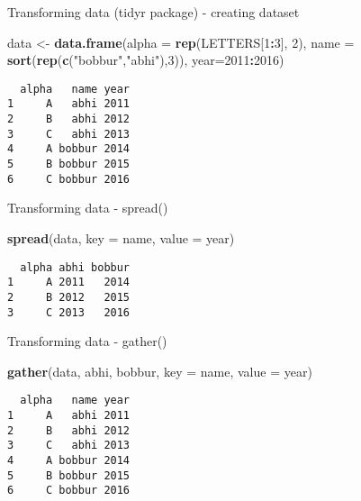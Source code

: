 \documentclass[ignorenonframetext,]{beamer}
\newenvironment{Shaded}{\begin{snugshade}}{\end{snugshade}}
\newcommand{\DataTypeTok}[1]{\textcolor[rgb]{0.13,0.29,0.53}{#1}}
\newcommand{\DecValTok}[1]{\textcolor[rgb]{0.00,0.00,0.81}{#1}}
\newcommand{\KeywordTok}[1]{\textcolor[rgb]{0.13,0.29,0.53}{\textbf{#1}}}
\newcommand{\NormalTok}[1]{#1}
\newcommand{\OperatorTok}[1]{\textcolor[rgb]{0.81,0.36,0.00}{\textbf{#1}}}
\newcommand{\StringTok}[1]{\textcolor[rgb]{0.31,0.60,0.02}{#1}}
\begin{document}
\begin{frame}[fragile]{Transforming data (tidyr package) - creating
dataset}
\protect\hypertarget{transforming-data-tidyr-package---creating-dataset}{}

\begin{Shaded}
\begin{Highlighting}[]
\NormalTok{data <-}\StringTok{ }\KeywordTok{data.frame}\NormalTok{(}\DataTypeTok{alpha =} \KeywordTok{rep}\NormalTok{(LETTERS[}\DecValTok{1}\OperatorTok{:}\DecValTok{3}\NormalTok{], }\DecValTok{2}\NormalTok{), }
\DataTypeTok{name =} \KeywordTok{sort}\NormalTok{(}\KeywordTok{rep}\NormalTok{(}\KeywordTok{c}\NormalTok{(}\StringTok{"bobbur"}\NormalTok{,}\StringTok{"abhi"}\NormalTok{),}\DecValTok{3}\NormalTok{)), }\DataTypeTok{year=}\DecValTok{2011}\OperatorTok{:}\DecValTok{2016}\NormalTok{)}
\end{Highlighting}
\end{Shaded}

\begin{verbatim}
  alpha   name year
1     A   abhi 2011
2     B   abhi 2012
3     C   abhi 2013
4     A bobbur 2014
5     B bobbur 2015
6     C bobbur 2016
\end{verbatim}

\end{frame}

\begin{frame}[fragile]{Transforming data - spread()}
\protect\hypertarget{transforming-data---spread}{}

\begin{Shaded}
\begin{Highlighting}[]
\KeywordTok{spread}\NormalTok{(data, }\DataTypeTok{key =}\NormalTok{ name, }\DataTypeTok{value =}\NormalTok{ year) }
\end{Highlighting}
\end{Shaded}

\begin{verbatim}
  alpha abhi bobbur
1     A 2011   2014
2     B 2012   2015
3     C 2013   2016
\end{verbatim}

\end{frame}

\begin{frame}[fragile]{Transforming data - gather()}
\protect\hypertarget{transforming-data---gather}{}

\begin{Shaded}
\begin{Highlighting}[]
\KeywordTok{gather}\NormalTok{(data, abhi, bobbur, }\DataTypeTok{key =}\NormalTok{ name, }\DataTypeTok{value =}\NormalTok{ year)}
\end{Highlighting}
\end{Shaded}

\begin{verbatim}
  alpha   name year
1     A   abhi 2011
2     B   abhi 2012
3     C   abhi 2013
4     A bobbur 2014
5     B bobbur 2015
6     C bobbur 2016
\end{verbatim}

\end{frame}
\end{document}
